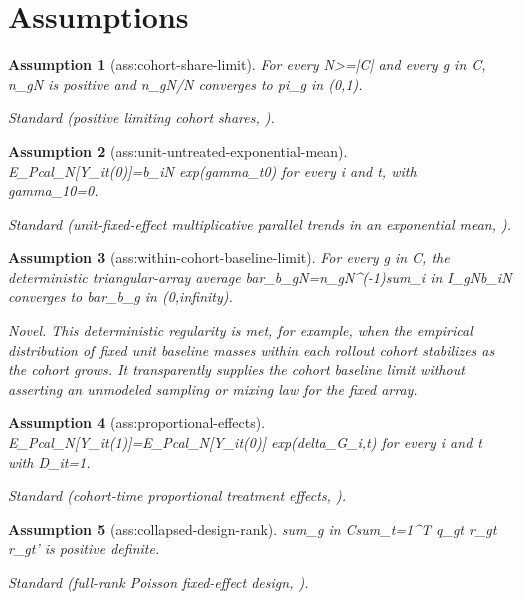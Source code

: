 \documentclass{article}
\newtheorem{assumption}{Assumption}
\begin{document}
\section{Assumptions}

\begin{assumption}[ass:cohort-share-limit]\label{ass:cohort-share-limit}
For every N>=|C| and every g in C, n_gN is positive and n_gN/N converges to pi_g in (0,1).
\par\smallskip\noindent\emph{Standard} (positive limiting cohort shares, \cite{deChaisemartinDHaultfoeuille2020TWFE}).
\end{assumption}

\begin{assumption}[ass:unit-untreated-exponential-mean]\label{ass:unit-untreated-exponential-mean}
E_Pcal_N[Y_it(0)]=b_iN exp(gamma_t0) for every i and t, with gamma_10=0.
\par\smallskip\noindent\emph{Standard} (unit-fixed-effect multiplicative parallel trends in an exponential mean, \cite{Wooldridge2023NonlinearDiD}).
\end{assumption}

\begin{assumption}[ass:within-cohort-baseline-limit]\label{ass:within-cohort-baseline-limit}
For every g in C, the deterministic triangular-array average bar_b_gN=n_gN^(-1)sum_{i in I_gN}b_iN converges to bar_b_g in (0,infinity).
\par\smallskip\noindent\emph{Novel.} This deterministic regularity is met, for example, when the empirical distribution of fixed unit baseline masses within each rollout cohort stabilizes as the cohort grows. It transparently supplies the cohort baseline limit without asserting an unmodeled sampling or mixing law for the fixed array.
\end{assumption}

\begin{assumption}[ass:proportional-effects]\label{ass:proportional-effects}
E_Pcal_N[Y_it(1)]=E_Pcal_N[Y_it(0)] exp(delta_{G_i,t}) for every i and t with D_it=1.
\par\smallskip\noindent\emph{Standard} (cohort-time proportional treatment effects, \cite{MoreauKastler2025PTT}).
\end{assumption}

\begin{assumption}[ass:collapsed-design-rank]\label{ass:collapsed-design-rank}
sum_{g in C}sum_{t=1}^T q_gt r_gt r_gt' is positive definite.
\par\smallskip\noindent\emph{Standard} (full-rank Poisson fixed-effect design, \cite{White1982MisspecifiedML}).
\end{assumption}
\end{document}

